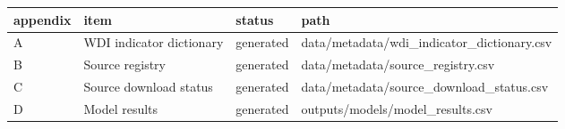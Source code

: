 ﻿%
\begin{tabular}{llll}
\hline
appendix & item & status & path \\
\hline
A & WDI indicator dictionary & generated & data/metadata/wdi\_indicator\_dictionary.csv \\
B & Source registry & generated & data/metadata/source\_registry.csv \\
C & Source download status & generated & data/metadata/source\_download\_status.csv \\
D & Model results & generated & outputs/models/model\_results.csv \\
\hline
\end{tabular}

